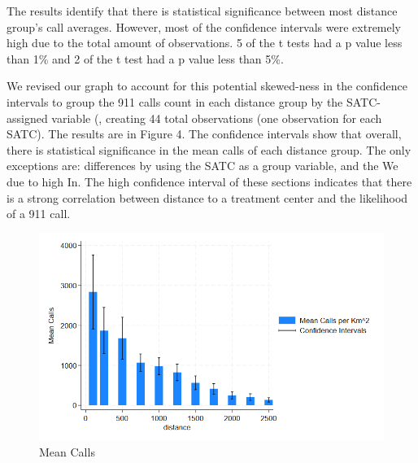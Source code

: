 \documentclass[12pt]{article}
\begin{document}
The results identify that there is statistical significance between most distance group's call averages. However, most of the confidence intervals were extremely high due to the total amount of observations. 5 of the t tests had a p value less than 1\% and 2 of the t test had a p value less than 5\%.  

We revised our graph to account for this potential skewed-ness in the confidence intervals to group the 911 calls count in each distance group by the SATC-assigned variable (, creating 44 total observations (one observation for each SATC). The results are in Figure 4. The confidence intervals show that overall, there is statistical significance in the mean calls of each distance group. The only exceptions are: differences by using the SATC as a group variable, and the We due to high In. The high confidence interval of these sections indicates that there is a strong correlation between distance to a treatment center and the likelihood of a 911 call.

 

\begin{figure}[ht]
    \centering
    \includegraphics[width=1\linewidth]{Reproducibility Package//Visual Graphics/CI_Graph.png}
    \caption{Mean Calls}
    \label{fig:enter-label}
\end{figure}
\end{document}
